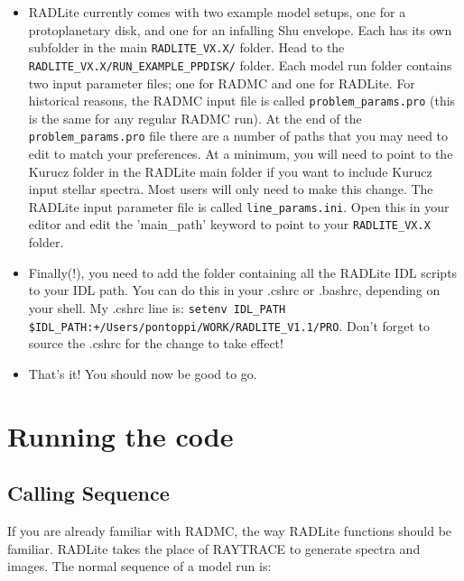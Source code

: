 \documentclass[11pt]{article}
\begin{document}
\begin{itemize}
\item RADLite currently comes with two example model setups, one for a protoplanetary disk, and one for an infalling Shu envelope.
Each has its own subfolder in the main {\tt RADLITE\_VX.X/} folder. Head to the {\tt RADLITE\_VX.X/RUN\_EXAMPLE\_PPDISK/} folder. Each model 
run folder contains two input parameter files; one for RADMC and one for RADLite. For historical reasons, the RADMC input file is called {\tt problem\_params.pro} (this
is the same for any regular RADMC run). At the end of the {\tt problem\_params.pro} file there are a number of paths that you may need to edit to match your
preferences. At a minimum, you will need to point to the Kurucz folder in the RADLite main folder if you want to include Kurucz input stellar spectra. Most users
will only need to make this change. The RADLite input parameter file is called {\tt line\_params.ini}. Open this in your editor and edit the 'main\_path' keyword to point to
your {\tt RADLITE\_VX.X} folder. 

\item Finally(!), you need to add the folder containing all the RADLite IDL scripts to your IDL path. You can do this in your .cshrc or .bashrc, depending on
your shell. My .cshrc line is: 
{\tt setenv IDL\_PATH     \$IDL\_PATH{:}+/Users/pontoppi/WORK/RADLITE\_V1.1/PRO}.
Don't forget to source the .cshrc for the change to take effect!

\item That's it! You should now be good to go. 

\end{itemize}

\section{Running the code}

\subsection{Calling Sequence}
If you are already familiar with RADMC, the way RADLite functions should be familiar. RADLite takes the place of RAYTRACE to generate spectra and images. 
The normal sequence of a model run is:
\end{document}
